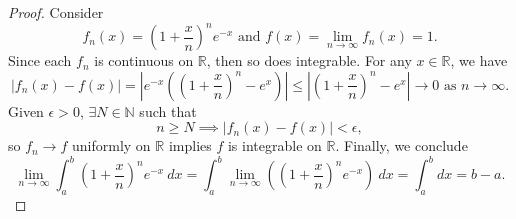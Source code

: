 \begin{Exercise}
\begin{proof}
Consider $$f_n(x) = \left( 1+\frac{x}{n} \right)^n e^{-x}\text{ and } f(x)=\lim_{n\to\infty}f_n(x) = 1.$$
Since each $f_n$ is continuous on $\mathbb{R}$, then so does integrable.
For any $x\in\mathbb{R}$, we have $$ \left| f_n(x) - f(x) \right| =
\left| e^{-x} \left( \left( 1+\frac{x}{n} \right)^n - e^x \right) \right| \leq
\left| \left( 1+\frac{x}{n} \right)^n - e^x \right|
\to0 \mbox{ as } n\to\infty.$$
Given $\epsilon > 0$, $\exists N\in\mathbb{N}$ such that $$n \geq N \implies \left| f_n(x) - f(x) \right| < \epsilon,$$
so $f_n \to f$ uniformly on $\mathbb{R}$ implies $f$ is integrable on $\mathbb{R}$. Finally, we conclude $$\lim_{n\to\infty} \int_{a}^{b} \left( 1+\frac{x}{n} \right)^n e^{-x}\ dx =
\int_{a}^{b} \lim_{n\to\infty} \left( \left( 1+\frac{x}{n} \right)^n e^{-x}\right)\ dx =
\int_{a}^{b} dx =
b-a.$$
\end{proof}
\end{Exercise}